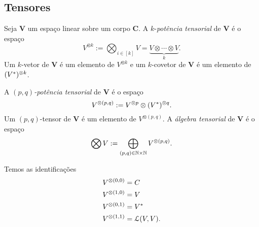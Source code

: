 



\subsection{Tensores}

\begin{definition}
Seja $\bm V$ um espaço linear sobre um corpo $\bm C$. A $k$-\emph{potência tensorial} de $\bm V$ é o espaço
	\begin{equation*}
	V^{\otimes k} := \bigotimes_{i \in [k]} V = \underbrace{V \otimes \cdots \otimes V}_{k}.
	\end{equation*}
Um $k$-vetor de $\bm V$ é um elemento de $V^{\otimes k}$ e um $k$-covetor de $\bm V$ é um elemento de $(V^*)^{\otimes k}$.

A \emph{$(p,q)$-potência tensorial} de $\bm V$ é o espaço
	\begin{equation*}
	V^{\otimes (p,q)} := V^{\otimes p} \otimes (V^*)^{\otimes q}.
	\end{equation*}
Um $(p,q)$-tensor de $\bm V$ é um elemento de $V^{\otimes (p,q)}$. A \emph{álgebra tensorial} de $\bm V$ é o espaço
	\begin{equation*}
	\bigotimes V := \bigoplus_{(p,q) \in \mathbb{N} \times \mathbb{N}} V^{\otimes (p,q)}.
	\end{equation*}
\end{definition}

Temos as identificações
	\begin{align*}
	V^{\otimes (0,0)} &= C \\
	V^{\otimes (1,0)} &= V \\
	V^{\otimes (0,1)} &= V^* \\
	V^{\otimes (1,1)} &= \mathcal{L}(V,V). \\
	\end{align*}